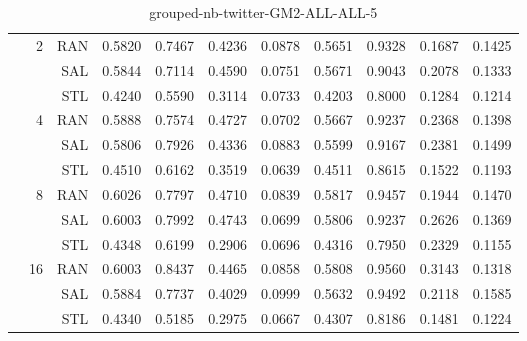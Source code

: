 \begin{center}
\begin{table}[htbp]
\begin{tabular}{ | r | r | r | r | r | r | r | r | r | r | r |}
 & \multirow{3}{*}{2} & RAN & 0.5820 & 0.7467 & 0.4236 & 0.0878 & 0.5651 & 0.9328 & 0.1687 & 0.1425\\ \cline{3-11}
 &   & SAL & 0.5844 & 0.7114 & 0.4590 & 0.0751 & 0.5671 & 0.9043 & 0.2078 & 0.1333\\ \cline{3-11}
 &   & STL & 0.4240 & 0.5590 & 0.3114 & 0.0733 & 0.4203 & 0.8000 & 0.1284 & 0.1214\\ \cline{2-11}
 & \multirow{3}{*}{4} & RAN & 0.5888 & 0.7574 & 0.4727 & 0.0702 & 0.5667 & 0.9237 & 0.2368 & 0.1398\\ \cline{3-11}
 &   & SAL & 0.5806 & 0.7926 & 0.4336 & 0.0883 & 0.5599 & 0.9167 & 0.2381 & 0.1499\\ \cline{3-11}
 &   & STL & 0.4510 & 0.6162 & 0.3519 & 0.0639 & 0.4511 & 0.8615 & 0.1522 & 0.1193\\ \cline{2-11}
 & \multirow{3}{*}{8} & RAN & 0.6026 & 0.7797 & 0.4710 & 0.0839 & 0.5817 & 0.9457 & 0.1944 & 0.1470\\ \cline{3-11}
 &   & SAL & 0.6003 & 0.7992 & 0.4743 & 0.0699 & 0.5806 & 0.9237 & 0.2626 & 0.1369\\ \cline{3-11}
 &   & STL & 0.4348 & 0.6199 & 0.2906 & 0.0696 & 0.4316 & 0.7950 & 0.2329 & 0.1155\\ \cline{2-11}
 & \multirow{3}{*}{16} & RAN & 0.6003 & 0.8437 & 0.4465 & 0.0858 & 0.5808 & 0.9560 & 0.3143 & 0.1318\\ \cline{3-11}
 &   & SAL & 0.5884 & 0.7737 & 0.4029 & 0.0999 & 0.5632 & 0.9492 & 0.2118 & 0.1585\\ \cline{3-11}
 &   & STL & 0.4340 & 0.5185 & 0.2975 & 0.0667 & 0.4307 & 0.8186 & 0.1481 & 0.1224\\ \cline{2-11}
\hline
\end{tabular}
\caption{grouped-nb-twitter-GM2-ALL-ALL-5}
\end{table}
\end{center}

